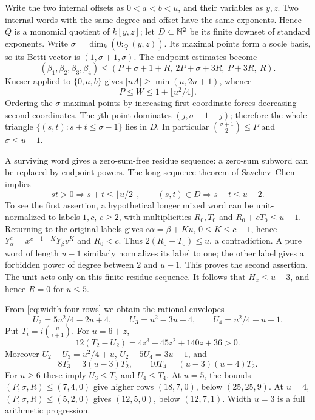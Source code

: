 Write the two internal offsets as $0<a<b<u$, and their variables as
$y,z$.  Two internal words with the same degree and offset have the
same exponents.  Hence $Q$ is a monomial quotient of $k[y,z]$;
let $D\subset\mathbb N^2$ be its finite downset of standard exponents.
Write $\sigma=\dim_k(0:_Q(y,z))$.  Its maximal points form a socle
basis, so its Betti vector is $(1,\sigma+1,\sigma)$.
The endpoint estimates become
\begin{equation}\label{eq:width-four-rows}
 (\beta_1,\beta_2,\beta_3,\beta_4)
 \le(P+\sigma+1+R,\ 2P+\sigma+3R,\ P+3R,\ R).
\end{equation}
Kneser applied to $\{0,a,b\}$ gives $|nA|\ge\min(u,2n+1)$, whence
\[
 P\le W\le1+\lfloor u^2/4\rfloor.
\]
Ordering the $\sigma$ maximal points by increasing first coordinate
forces decreasing second coordinates.  The $j$th point dominates
$(j,\sigma-1-j)$; therefore the whole triangle
$\{(s,t):s+t\le\sigma-1\}$ lies in $D$.
In particular $\binom{\sigma+1}2\le P$ and $\sigma\le u-1$.

A surviving word gives a zero-sum-free residue sequence: a zero-sum
subword can be replaced by endpoint powers.  The long-sequence theorem
of Savchev--Chen \cite{SavchevChen} implies
\begin{equation}\label{eq:width-word-length}
 st>0\Longrightarrow s+t\le\lfloor u/2\rfloor,
 \qquad (s,t)\in D\Longrightarrow s+t\le u-2.
\end{equation}
To see the first assertion, a hypothetical longer mixed word can be
unit-normalized to labels $1,c$, $c\ge2$, with multiplicities $R_0,T_0$
and $R_0+cT_0\le u-1$.  Returning to the original labels gives
$c\alpha=\beta+Ku$, $0\le K\le c-1$, hence
$Y_\alpha^c=x^{c-1-K}Y_\beta v^K$ and $R_0<c$.
Thus $2(R_0+T_0)\le u$, a contradiction.
A pure word of length $u-1$ similarly normalizes its label to one;
the other label gives a forbidden power of degree between $2$ and
$u-1$.  This proves the second assertion.  The unit acts only on this
finite residue sequence.  It follows that $H_x\le u-3$, and hence
$R=0$ for $u\le5$.

From \eqref{eq:width-four-rows} we obtain the rational envelopes
\[
 U_2=5u^2/4-2u+4,\qquad U_3=u^2-3u+4,
 \qquad U_4=u^2/4-u+1.
\]
Put $T_i=i\binom u{i+1}$.  For $u=6+z$,
\begin{equation}\label{eq:width-four-cubic}
 12(T_2-U_2)=4z^3+45z^2+140z+36>0.
\end{equation}
Moreover $U_2-U_3=u^2/4+u$, $U_2-5U_4=3u-1$, and
\[
 8T_3=3(u-3)T_2,\qquad
 10T_4=(u-3)(u-4)T_2.
\]
For $u\ge6$ these imply $U_3\le T_3$ and $U_4\le T_4$.
At $u=5$, the bounds $(P,\sigma,R)\le(7,4,0)$ give higher rows
$(18,7,0)$, below $(25,25,9)$.
At $u=4$, $(P,\sigma,R)\le(5,2,0)$ gives $(12,5,0)$, below
$(12,7,1)$.  Width $u=3$ is a full arithmetic progression.

